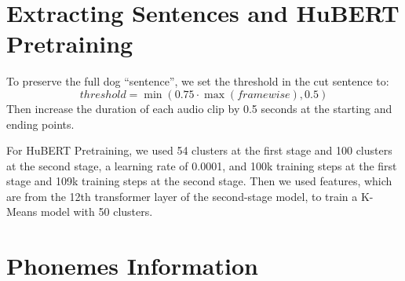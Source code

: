 \section{Extracting Sentences and HuBERT Pretraining}
\label{sec:appendix_a}

To preserve the full dog ``sentence'', we set the threshold in the cut sentence to:
\begin{equation*}
    threshold = \mathop{min}(0.75 \cdot \mathop{max}(framewise), 0.5)
\end{equation*}
Then increase the duration of each audio clip by 0.5 seconds at the starting and ending points.

For HuBERT Pretraining, we used 54 clusters at the first stage and 100 clusters at the second stage, a learning rate of 0.0001, and 100k training steps at the first stage and 109k training steps at the second stage. Then we used features, which are from the 12th transformer layer of the second-stage model, to train a K-Means model with 50 clusters.

\section{Phonemes Information}

